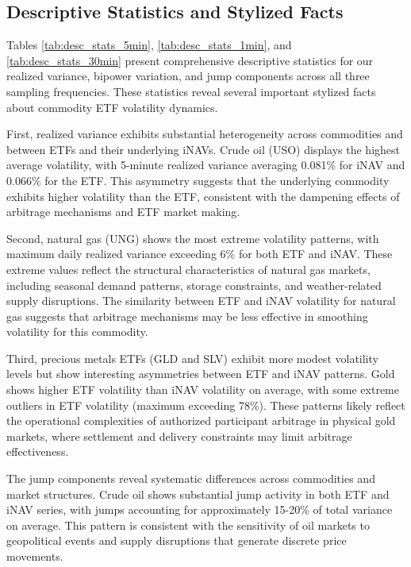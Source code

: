 \subsection{Descriptive Statistics and Stylized Facts}

Tables \ref{tab:desc_stats_5min}, \ref{tab:desc_stats_1min}, and \ref{tab:desc_stats_30min} present comprehensive descriptive statistics for our realized variance, bipower variation, and jump components across all three sampling frequencies. These statistics reveal several important stylized facts about commodity ETF volatility dynamics.

First, realized variance exhibits substantial heterogeneity across commodities and between ETFs and their underlying iNAVs. Crude oil (USO) displays the highest average volatility, with 5-minute realized variance averaging 0.081\% for iNAV and 0.066\% for the ETF. This asymmetry suggests that the underlying commodity exhibits higher volatility than the ETF, consistent with the dampening effects of arbitrage mechanisms and ETF market making.

Second, natural gas (UNG) shows the most extreme volatility patterns, with maximum daily realized variance exceeding 6\% for both ETF and iNAV. These extreme values reflect the structural characteristics of natural gas markets, including seasonal demand patterns, storage constraints, and weather-related supply disruptions. The similarity between ETF and iNAV volatility for natural gas suggests that arbitrage mechanisms may be less effective in smoothing volatility for this commodity.

Third, precious metals ETFs (GLD and SLV) exhibit more modest volatility levels but show interesting asymmetries between ETF and iNAV patterns. Gold shows higher ETF volatility than iNAV volatility on average, with some extreme outliers in ETF volatility (maximum exceeding 78\%). These patterns likely reflect the operational complexities of authorized participant arbitrage in physical gold markets, where settlement and delivery constraints may limit arbitrage effectiveness.

The jump components reveal systematic differences across commodities and market structures. Crude oil shows substantial jump activity in both ETF and iNAV series, with jumps accounting for approximately 15-20\% of total variance on average. This pattern is consistent with the sensitivity of oil markets to geopolitical events and supply disruptions that generate discrete price movements.

